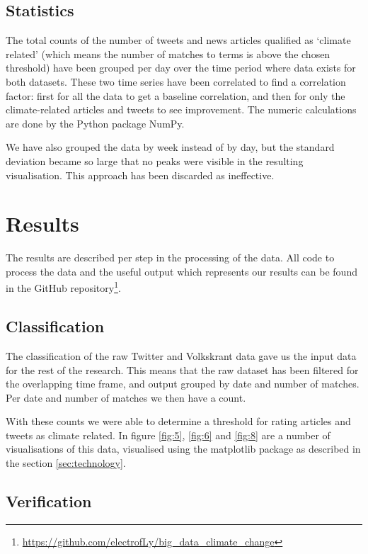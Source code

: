 \documentclass[paper=a4, fontsize=9px]{scrartcl} %
\numberwithin{equation}{section} %
\numberwithin{figure}{section} %
\numberwithin{table}{section} %
\begin{document}
\begin{multicols}{2}
\subsection{Statistics}

The total counts of the number of tweets and news articles qualified as `climate related’ (which means the number of matches to terms is above the chosen threshold) have been grouped per day over the time period where data exists for both datasets. These two time series have been correlated to find a correlation factor: first for all the data to get a baseline correlation, and then for only the climate-related articles and tweets to see improvement. The numeric calculations are done by the Python package NumPy.

We have also grouped the data by week instead of by day, but the standard deviation became so large that no peaks were visible in the resulting visualisation. This approach has been discarded as ineffective.

\section{Results}\label{sec:results}

The results are described per step in the processing of the data. All code to process the data and the useful output which represents our results can be found in the GitHub repository\footnote{\url{https://github.com/electrofLy/big\_data\_climate\_change}}.


\subsection{Classification}

The classification of the raw Twitter and Volkskrant data gave us the input data for the rest of the research. This means that the raw dataset has been filtered for the overlapping time frame, and output grouped by date and number of matches. Per date and number of matches we then have  a count. 

With these counts we were able to determine a threshold for rating articles and tweets as climate related. In figure \ref{fig:5}, \ref{fig:6} and \ref{fig:8} are a number of visualisations of this data, visualised using the matplotlib package as described in the section \ref{sec:technology}.


\subsection{Verification}


\end{multicols}
\end{document}

